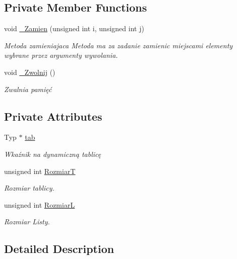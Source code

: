 \subsection*{Private Member Functions}
\begin{DoxyCompactItemize}
\item 
void \hyperlink{class_list_arr2x_a5864b6c097b593e0c126a79837f8fb19}{\-\_\-\-Zamien} (unsigned int i, unsigned int j)
\begin{DoxyCompactList}\small\item\em Metoda zamieniajaca Metoda ma za zadanie zamienic miejscami elementy wybrane przez argumenty wywolania. \end{DoxyCompactList}\item 
void \hyperlink{class_list_arr2x_aec30c6d499f26d03e94e001e1358ee18}{\-\_\-\-Zwolnij} ()
\begin{DoxyCompactList}\small\item\em Zwalnia pamięć \end{DoxyCompactList}\end{DoxyCompactItemize}
\subsection*{Private Attributes}
\begin{DoxyCompactItemize}
\item 
Typ $\ast$ \hyperlink{class_list_arr2x_a6079e03d75b837d563aac676b80a9da2}{tab}
\begin{DoxyCompactList}\small\item\em Wkaźnik na dynamiczną tablicę \end{DoxyCompactList}\item 
unsigned int \hyperlink{class_list_arr2x_ac414e40eb15aaa95be5fe2c534a9a8b7}{Rozmiar\-T}
\begin{DoxyCompactList}\small\item\em Rozmiar tablicy. \end{DoxyCompactList}\item 
unsigned int \hyperlink{class_list_arr2x_abc3468541635f4153c24b76ef573cd65}{Rozmiar\-L}
\begin{DoxyCompactList}\small\item\em Rozmiar Listy. \end{DoxyCompactList}\end{DoxyCompactItemize}


\subsection{Detailed Description}
